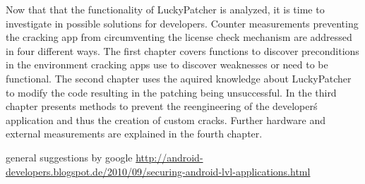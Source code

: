 Now that that the functionality of LuckyPatcher is analyzed, it is time to investigate in possible solutions for developers. Counter measurements preventing the cracking app from circumventing the license check mechanism are addressed in four different ways.\newline
The first chapter covers functions to discover preconditions in the environment cracking apps use to discover weaknesses or need to be functional. The second chapter uses the aquired knowledge about LuckyPatcher to modify the code resulting in the patching being unsuccessful. In the third chapter presents methods to prevent the reengineering of the developer\'s application and thus the creation of custom cracks. Further hardware and external measurements are explained in the fourth chapter.\newline

general suggestions by google  \url{http://android-developers.blogspot.de/2010/09/securing-android-lvl-applications.html}

